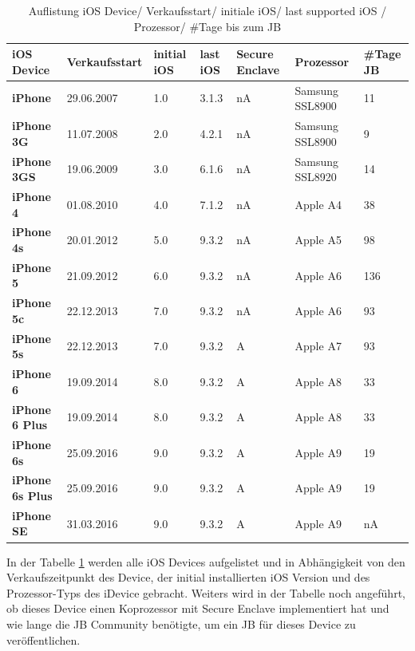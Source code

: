 \begin{table}[htp!]
    \begin{center}
        \begin{tabular}{|p{30mm}|p{27mm}|p{12mm}|p{10mm}|p{18mm}|p{2cm}|p{15mm}|} \hline
            \textbf{iOS Device} & \textbf{Verkaufsstart} & \textbf{initial iOS} & \textbf{last iOS} & \textbf{Secure Enclave} & \textbf{Prozessor}  & \textbf{\#Tage JB} \\ \hline
            \textbf{iPhone} & 29.06.2007  & 1.0 & 3.1.3 & nA & Samsung SSL8900 & 11\\ \hline
            \textbf{iPhone 3G} & 11.07.2008 & 2.0 & 4.2.1 & nA & Samsung SSL8900 & 9\\ \hline
            \textbf{iPhone 3GS} & 19.06.2009 & 3.0 & 6.1.6 & nA & Samsung SSL8920 & 14\\ \hline
            \textbf{iPhone 4} & 01.08.2010 & 4.0 & 7.1.2 & nA & Apple A4 & 38 \\ \hline
            \textbf{iPhone 4s} & 20.01.2012 & 5.0 & 9.3.2 & nA & Apple A5 & 98 \\ \hline 
            \textbf{iPhone 5} & 21.09.2012 & 6.0 &  9.3.2 & nA & Apple A6 & 136 \\ \hline
            \textbf{iPhone 5c} & 22.12.2013 & 7.0 & 9.3.2 & nA & Apple A6 & 93 \\ \hline
            \textbf{iPhone 5s} & 22.12.2013 & 7.0 & 9.3.2 & A & Apple A7 & 93 \\ \hline
            \textbf{iPhone 6} & 19.09.2014 & 8.0 & 9.3.2 & A & Apple A8 & 33\\ \hline
            \textbf{iPhone 6 Plus} & 19.09.2014 & 8.0 & 9.3.2 &  A & Apple A8 & 33\\ \hline
            \textbf{iPhone 6s} & 25.09.2016 & 9.0 &  9.3.2 & A & Apple A9 & 19\\ \hline
            \textbf{iPhone 6s Plus} & 25.09.2016 & 9.0 & 9.3.2 &  A & Apple A9 & 19\\ \hline
            \textbf{iPhone SE} & 31.03.2016 & 9.0 &  9.3.2 & A & Apple A9 & nA\\ \hline  
        \end{tabular} 
        \caption{Auflistung iOS Device/ Verkaufsstart/ initiale iOS/ last supported iOS / Prozessor/ \#Tage bis zum JB}
        \label{tab:iOSHW}
    \end{center}
\end{table}
In der Tabelle \ref{tab:iOSHW} werden alle iOS Devices aufgelistet und in Abhängigkeit von den Verkaufszeitpunkt des Device, der initial installierten iOS Version und des Prozessor-Typs des iDevice gebracht. Weiters wird in der Tabelle noch angeführt, ob dieses Device einen Koprozessor mit Secure Enclave implementiert hat und wie lange die JB Community benötigte, um ein JB für dieses Device zu veröffentlichen.\par


